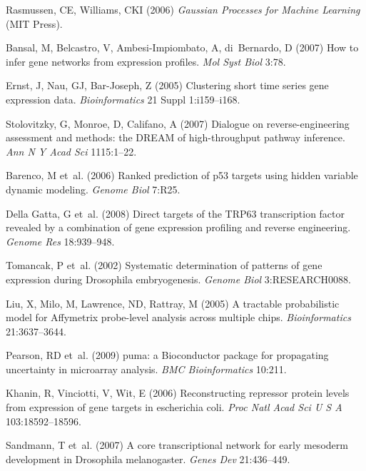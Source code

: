 \documentclass{pnastwo}
\begin{document}
\begin{article}
\begin{thebibliography}{10}
Rasmussen, CE, Williams, CKI
\newblock (2006) \emph{Gaussian Processes for Machine Learning}
\newblock (MIT Press).

Bansal, M, Belcastro, V, Ambesi-Impiombato, A, di~Bernardo, D
\newblock (2007) How to infer gene networks from expression profiles.
\newblock \emph{Mol Syst Biol} 3:78.

Ernst, J, Nau, GJ, Bar-Joseph, Z
\newblock (2005) Clustering short time series gene expression data.
\newblock \emph{Bioinformatics} 21 Suppl 1:i159--i168.

Stolovitzky, G, Monroe, D, Califano, A
\newblock (2007) Dialogue on reverse-engineering assessment and methods: the
  {DREAM} of high-throughput pathway inference.
\newblock \emph{Ann N Y Acad Sci} 1115:1--22.

Barenco, M et~al.
\newblock (2006) Ranked prediction of p53 targets using hidden variable dynamic
  modeling.
\newblock \emph{Genome Biol} 7:R25.

{Della Gatta}, G et~al.
\newblock (2008) Direct targets of the {TRP63} transcription factor revealed by
  a combination of gene expression profiling and reverse engineering.
\newblock \emph{Genome Res} 18:939--948.

Tomancak, P et~al.
\newblock (2002) Systematic determination of patterns of gene expression during
  {D}rosophila embryogenesis.
\newblock \emph{Genome Biol} 3:RESEARCH0088.

Liu, X, Milo, M, Lawrence, ND, Rattray, M
\newblock (2005) A tractable probabilistic model for {A}ffymetrix probe-level
  analysis across multiple chips.
\newblock \emph{Bioinformatics} 21:3637--3644.

Pearson, RD et~al.
\newblock (2009) puma: a {B}ioconductor package for propagating uncertainty in
  microarray analysis.
\newblock \emph{BMC Bioinformatics} 10:211.

Khanin, R, Vinciotti, V, Wit, E
\newblock (2006) Reconstructing repressor protein levels from expression of
  gene targets in escherichia coli.
\newblock \emph{Proc Natl Acad Sci U S A} 103:18592--18596.

Sandmann, T et~al.
\newblock (2007) A core transcriptional network for early mesoderm development
  in {D}rosophila melanogaster.
\newblock \emph{Genes Dev} 21:436--449.


\end{thebibliography}
\end{article}
\end{document}
